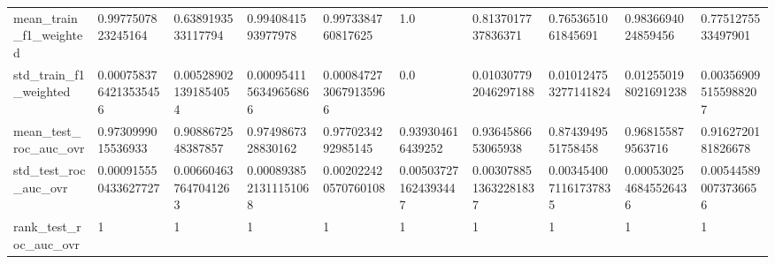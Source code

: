 \begin{tabular}{llllllllll}
mean\_train\_f1\_weighted      &                                 0.9977507823245164 &                                 0.6389193533117794 &                                 0.9940841593977978 &                                 0.9973384760817625 &                                                1.0 &                                 0.8137017737836371 &                                 0.7653651061845691 &                                 0.9836694024859456 &                                 0.7751275533497901 \\
std\_train\_f1\_weighted       &                              0.0007583764213535456 &                               0.005289021391854054 &                              0.0009541156349656866 &                              0.0008472730679135966 &                                                0.0 &                               0.010307792046297188 &                               0.010124753277141824 &                               0.012550198021691238 &                               0.003569095155988207 \\
mean\_test\_roc\_auc\_ovr       &                                 0.9730999015536933 &                                 0.9088672548387857 &                                 0.9749867328830162 &                                 0.9770234292985145 &                                  0.939304616439252 &                                 0.9364586653065938 &                                 0.8743949551758458 &                                  0.968155879563716 &                                 0.9162720181826678 \\
std\_test\_roc\_auc\_ovr        &                               0.000915550433627727 &                               0.006604637647041263 &                              0.0008938521311151068 &                               0.002022420570760108 &                               0.005037271624393447 &                              0.0030788513632281837 &                              0.0034540071161737835 &                              0.0005302546845526436 &                               0.005445890073736656 \\
rank\_test\_roc\_auc\_ovr       &                                                  1 &                                                  1 &                                                  1 &                                                  1 &                                                  1 &                                                  1 &                                                  1 &                                                  1 &                                                  1 \\

\end{tabular}
